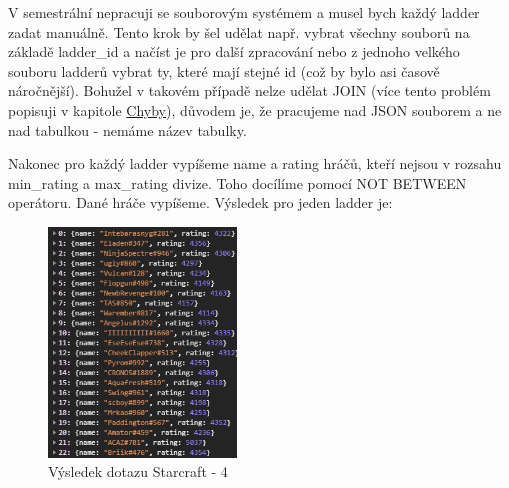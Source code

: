 \documentclass[a4, titlepage]{article}
\begin{document}
V semestrální nepracuji se souborovým systémem a musel bych každý ladder zadat manuálně. Tento krok by šel udělat např. vybrat všechny souborů na základě ladder\_id a načíst je pro další zpracování nebo z jednoho velkého souboru ladderů vybrat ty, které mají stejné id (což by bylo asi časově náročnější). Bohužel v takovém případě nelze udělat JOIN (více tento problém popisuji v kapitole \hyperlink{Error}{Chyby}), důvodem je, že pracujeme nad JSON souborem a ne nad tabulkou - nemáme název tabulky.

Nakonec pro každý ladder vypíšeme name a rating hráčů, kteří nejsou v rozsahu min\_rating a max\_rating divize. Toho docílíme pomocí NOT BETWEEN operátoru. Dané hráče vypíšeme. Výsledek pro jeden ladder je: 
\begin{figure}[h]
    \centering
    \includegraphics[width=5cm]{S4}
    \caption{Výsledek dotazu Starcraft - 4}
\end{figure} 
\newpage
\end{document}

